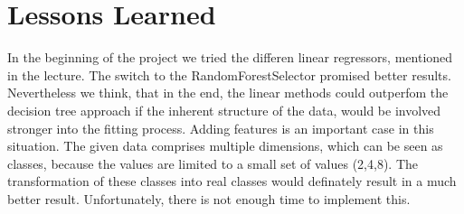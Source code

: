 \documentclass[a4paper, 10pt]{article}
\begin{document}
\section{Lessons Learned}
In the beginning of the project we tried the differen linear regressors, mentioned in the lecture. The switch to the RandomForestSelector promised better results. Nevertheless we think, that in the end, the linear methods could outperfom the decision tree approach if the inherent structure of the data, would be involved stronger into the fitting process. Adding features is an important case in this situation. The given data comprises multiple dimensions, which can be seen as classes, because the values are limited to a small set of values (2,4,8). The transformation of these classes into real classes would definately result in a much better result. Unfortunately, there is not enough time to implement this.
\end{document}
